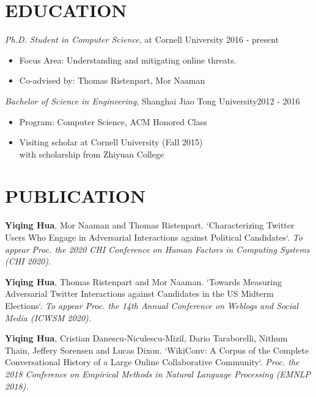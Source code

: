 \documentclass[margin, 10pt]{res} %
\begin{document}
\begin{resume}



\section{EDUCATION}

{\sl Ph.D. Student in Computer Science,} at Cornell University \hfill 2016 - present \\
\begin{itemize}
\item Focus Area: Understanding and mitigating online threats.
\item Co-advised by: Thomas Ristenpart, Mor Naaman
\end{itemize}
{\sl Bachelor of Science in Engineering,} Shanghai Jiao Tong University\hfill 2012 - 2016\\
\begin{itemize}
\item Program: Computer Science, ACM Honored Class
\item Visiting scholar at Cornell University (Fall 2015) \\with scholarship from Zhiyuan College
\end{itemize}


\section{PUBLICATION}

\textbf{Yiqing Hua}, Mor Naaman and Thomas Ristenpart.
`Characterizing Twitter Users Who Engage in Adversarial Interactions against Political Candidates`.
\textit{To appear Proc. the 2020 CHI Conference on Human Factors in Computing Systems (CHI 2020).}

\textbf{Yiqing Hua}, Thomas Ristenpart and Mor Naaman.
`Towards Measuring Adversarial Twitter Interactions against Candidates in the US Midterm Elections`.
\textit{To appear Proc. the 14th Annual Conference on Weblogs and Social Media (ICWSM 2020).}

\textbf{Yiqing Hua}, Cristian Danescu-Niculescu-Mizil, Dario Taraborelli, Nithum Thain, Jeffery Sorensen and Lucas Dixon.
`WikiConv: A Corpus of the Complete Conversational History of a Large Online Collaborative Community`.
\textit{Proc. the 2018 Conference on Empirical Methods in Natural Language Processing (EMNLP 2018).}


\end{resume}
\end{document}

